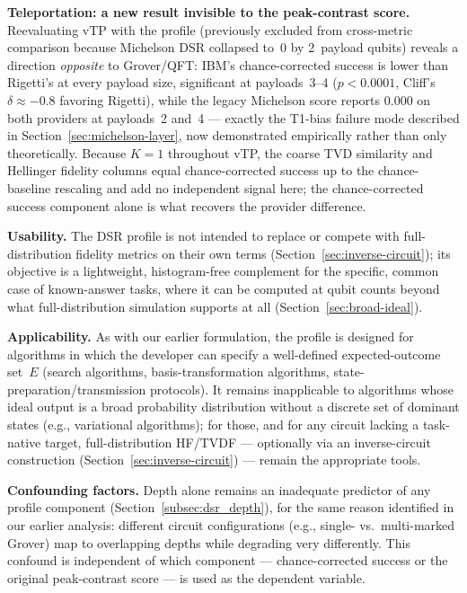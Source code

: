 \textbf{Teleportation: a new result invisible to the peak-contrast score.} Reevaluating vTP with the profile (previously excluded from cross-metric comparison because Michelson DSR collapsed to~$0$ by 2~payload qubits) reveals a direction \emph{opposite} to Grover/QFT: IBM's chance-corrected success is lower than Rigetti's at every payload size, significant at payloads~3--4 ($p<0.0001$, Cliff's~$\delta \approx -0.8$ favoring Rigetti), while the legacy Michelson score reports $0.000$ on both providers at payloads~2 and~4 --- exactly the T1-bias failure mode described in Section~\ref{sec:michelson-layer}, now demonstrated empirically rather than only theoretically. Because $K=1$ throughout vTP, the coarse TVD similarity and Hellinger fidelity columns equal chance-corrected success up to the chance-baseline rescaling and add no independent signal here; the chance-corrected success component alone is what recovers the provider difference.



\textbf{Usability.} The DSR profile is not intended to replace or compete with full-distribution fidelity metrics on their own terms (Section~\ref{sec:inverse-circuit}); its objective is a lightweight, histogram-free complement for the specific, common case of known-answer tasks, where it can be computed at qubit counts beyond what full-distribution simulation supports at all (Section~\ref{sec:broad-ideal}).

\textbf{Applicability.} As with our earlier formulation, the profile is designed for algorithms in which the developer can specify a well-defined expected-outcome set~$E$ (search algorithms, basis-transformation algorithms, state-preparation/transmission protocols). It remains inapplicable to algorithms whose ideal output is a broad probability distribution without a discrete set of dominant states (e.g., variational algorithms); for those, and for any circuit lacking a task-native target, full-distribution HF/TVDF --- optionally via an inverse-circuit construction (Section~\ref{sec:inverse-circuit}) --- remain the appropriate tools.

\textbf{Confounding factors.} Depth alone remains an inadequate predictor of any profile component (Section~\ref{subsec:dsr_depth}), for the same reason identified in our earlier analysis: different circuit configurations (e.g., single- vs.\ multi-marked Grover) map to overlapping depths while degrading very differently. This confound is independent of which component --- chance-corrected success or the original peak-contrast score --- is used as the dependent variable.

